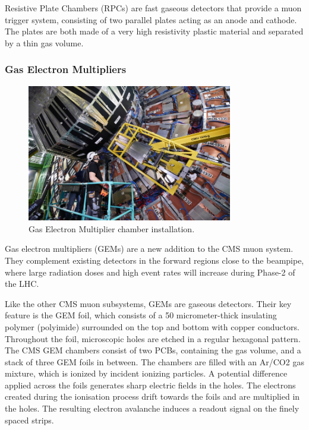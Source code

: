 Resistive Plate Chambers (RPCs) are fast gaseous detectors that provide a muon trigger system, consisting of two parallel plates acting as an anode and cathode. The plates are both made of a very high resistivity plastic material and separated by a thin gas volume.

\subsubsection{Gas Electron Multipliers}

\begin{figure}
\centering
\includegraphics[width=0.80\textwidth]{figures/GEMinstallation.jpg}
\caption{Gas Electron Multiplier chamber installation.}
\label{fig:GEMinstallation}
\end{figure}

Gas electron multipliers (GEMs) are a new addition to the CMS muon system. They complement existing detectors in the forward regions close to the beampipe, where large radiation doses and high event rates will increase during Phase-2 of the LHC.

Like the other CMS muon subsystems, GEMs are gaseous detectors. Their key feature is the GEM foil, which consists of a 50 micrometer-thick insulating polymer (polyimide) surrounded on the top and bottom with copper conductors. Throughout the foil, microscopic holes are etched in a regular hexagonal pattern. The CMS GEM chambers consist of two PCBs, containing the gas volume, and a stack of three GEM foils in between. The chambers are filled with an Ar/CO2 gas mixture, which is ionized by incident ionizing particles. A potential difference applied across the foils generates sharp electric fields in the holes. The electrons created during the ionisation process drift towards the foils and are multiplied in the holes. The resulting electron avalanche induces a readout signal on the finely spaced strips.

